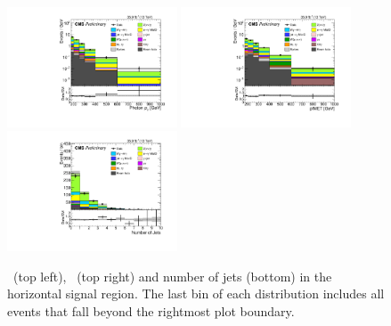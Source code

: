\begin{figure}[htbp]
  \begin{center}
    \includegraphics[width=0.45\textwidth]{Figures/results/znng_below0p5_phoPt.pdf}
    \includegraphics[width=0.45\textwidth]{Figures/results/znng_below0p5_pfMET.pdf}
    \includegraphics[width=0.45\textwidth]{Figures/results/znng_below0p5_nJet.pdf}
    \caption{
      \ETgamma\ (top left), \MET\ (top right) and number of jets (bottom) in the horizontal signal region.
      The last bin of each distribution includes all events that fall beyond the rightmost plot boundary.
    }
    \label{fig:monoph_below0p5}
  \end{center}
\end{figure}



